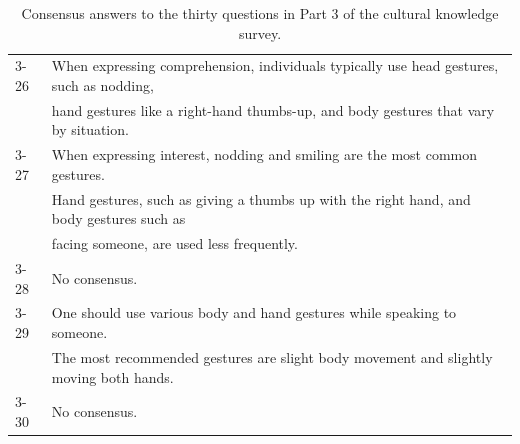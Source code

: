 \documentclass{CSSRforAfrica}
\begin{document}
\begin{table}[H]
\begin{center}
\begin{tabularx}{\linewidth}{|l |X|}
\vspace{-0.2mm} {\small 3-26 }   & {\small When expressing comprehension, individuals typically use head gestures, such as nodding,} \\
\vspace{-0.2mm} {\small  }   & {\small hand gestures like a right-hand thumbs-up, and body gestures that vary by situation.} \\

\vspace{-0.2mm} {\small 3-27 } & {\small When expressing interest, nodding and smiling are the most common gestures.} \\
\vspace{-0.2mm} {\small } & {\small Hand gestures, such as giving a thumbs up with the right hand, and body gestures such as} \\
\vspace{-0.2mm} {\small } & {\small  facing someone, are used less frequently.} \\

\vspace{-0.2mm} {\small 3-28 } & {\small No consensus.} \\

\vspace{-0.2mm} {\small 3-29 }  & {\small One should use various body and hand gestures while speaking to someone. } \\
\vspace{-0.2mm}  & {\small The most recommended gestures are slight body movement and slightly moving both hands.} \\

\vspace{-0.2mm} {\small 3-30 } & {\small No consensus.} \\
\hline \hline
\end{tabularx}
\end{center}
\vspace{-5mm}
\caption{ Consensus answers to the thirty questions in Part 3 of the cultural knowledge survey.}
\label{table:AllAnswers3}
\end{table}
\end{document}
